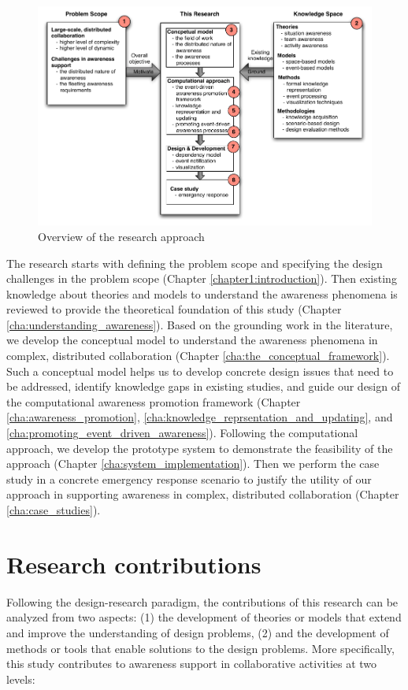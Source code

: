 \begin{figure}[htbp] %
   \centering
   \includegraphics[width=5.8in]{research_overview.pdf} 
   \caption{Overview of the research approach}
   \label{fig:research_overview}
\end{figure}

The research starts with defining the problem scope and specifying the design challenges in the problem scope (Chapter \ref{chapter1:introduction}). Then existing knowledge about theories and models to understand the awareness phenomena is reviewed to provide the theoretical foundation of this study (Chapter \ref{cha:understanding_awareness}). Based on the grounding work in the literature, we develop the conceptual model to understand the awareness phenomena in complex, distributed collaboration (Chapter \ref{cha:the_conceptual_framework}). Such a conceptual model helps us to develop concrete design issues that need to be addressed, identify knowledge gaps in existing studies, and guide our design of the computational awareness promotion framework (Chapter \ref{cha:awareness_promotion}, \ref{cha:knowledge_reprsentation_and_updating}, and \ref{cha:promoting_event_driven_awareness}). Following the computational approach, we develop the prototype system to demonstrate the feasibility of the approach (Chapter \ref{cha:system_implementation}). Then we perform the case study in a concrete emergency response scenario to justify the utility of our approach in supporting awareness in complex, distributed collaboration (Chapter \ref{cha:case_studies}). 

\section{Research contributions} %
\label{sec:research_contributions}
Following the design-research paradigm, the contributions of this research can be analyzed from two aspects: (1) the development of theories or models that extend and improve the understanding of design problems, (2) and the development of methods or tools that enable solutions to the design problems. More specifically, this study contributes to awareness support in collaborative activities at two levels:

